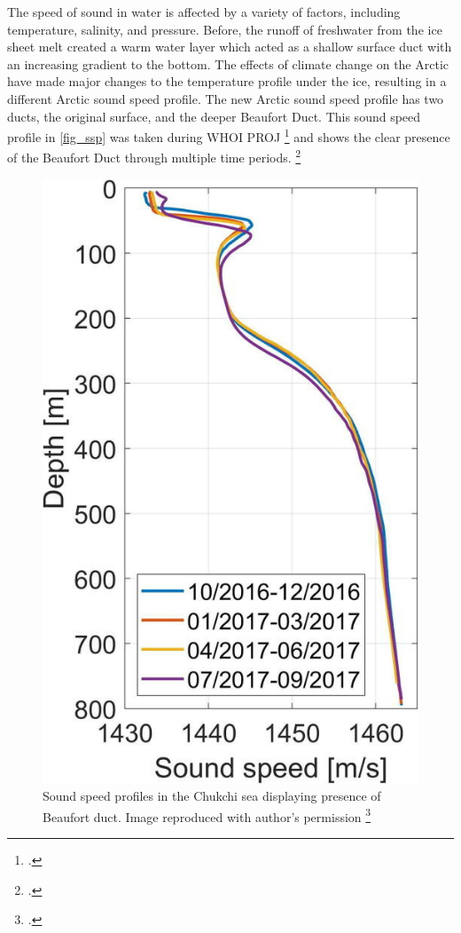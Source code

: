 The speed of sound in water is affected by a variety of factors, including temperature, salinity, and pressure. Before, the runoff of freshwater from the ice sheet melt created a warm water layer which acted as a shallow surface duct with an increasing gradient to the bottom. The effects of climate change on the Arctic have made major changes to the temperature profile under the ice, resulting in a different Arctic sound speed profile. The new Arctic sound speed profile has two ducts, the original surface, and the deeper Beaufort Duct. This sound speed profile in \autoref{fig_ssp} was taken during WHOI PROJ \footcite[]{toole2010influences} and shows the clear presence of the Beaufort Duct through multiple time periods. \footcite[]{Bonnel2021} 

\begin{figure}[ht]
\centering
\includegraphics[scale=2]{Figures/ssp.jpeg}
\caption{Sound speed profiles in the Chukchi sea displaying presence of Beaufort duct. Image reproduced with author's permission \footcite[]{Bonnel2021}}
\label{fig_ssp}
\end{figure}

